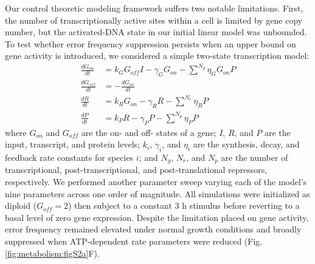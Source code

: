 Our control theoretic modeling framework suffers two notable limitations. First, the number of transcriptionally active sites within a cell is limited by gene copy number, but the activated-DNA state in our initial linear model was unbounded. To test whether error frequency suppression persists when an upper bound on gene activity is introduced, we considered a simple two-state transcription model:
\begin{equation}
\begin{aligned}
\label{metabolism:model:two}
\frac{dG_{on}}{dt} &= k_{G}G_{off}I -\gamma_G G_{on} - \sum^{N_g}{\eta_{G} G_{on}P} \\
\frac{dG_{off}}{dt} &= -\frac{dG_{on}}{dt} \\
\frac{dR}{dt} &= k_{R} G_{on} -\gamma_R R -\sum^{N_r}{\eta_{R} P} \\
\frac{dP}{dt} &= k_{P} R -\gamma_P P -\sum^{N_p}{\eta_{P} P}
\end{aligned}
\end{equation}
where $G_{on}$ and $G_{off}$ are the on- and off- states of a gene; $I$, $R$, and $P$ are the input, transcript, and protein levels; $k_i$, $\gamma_i$, and $\eta_i$ are the synthesis, decay, and feedback rate constants for species $i$; and $N_g$, $N_r$, and $N_p$ are the number of transcriptional, post-transcriptional, and post-translational repressors, respectively. We performed another parameter sweep varying each of the model's nine parameters across one order of magnitude. All simulations were initialized as diploid ($G_{off}=2$) then subject to a constant 3 h stimulus before reverting to a basal level of zero gene expression. Despite the limitation placed on gene activity, error frequency remained elevated under normal growth conditions and broadly suppressed when ATP-dependent rate parameters were reduced (Fig. \ref{fig:metabolism:figS2a}F).

